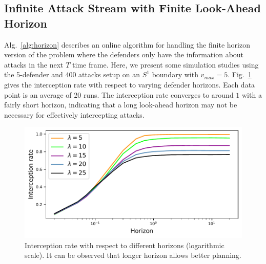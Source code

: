 \subsection{Infinite Attack Stream with Finite Look-Ahead Horizon}
Alg.~\ref{alg:horizon} describes an online \ours algorithm for handling the finite horizon version of the problem where the defenders only have the information about attacks in the next $T$ time frame.
Here, we present some simulation studies using the 5-defender and 400 attacks setup on an $S^1$ boundary with $v_{max} = 5$. Fig.~\ref{fig:horizon} gives the interception rate with respect to varying defender horizons. Each data point is an average of 20 runs. The interception rate converges to around $1$ with a fairly short horizon, indicating that a long look-ahead horizon may not be necessary for effectively intercepting attacks.
\begin{figure}
    \vspace{-1mm}
    \centering
    \includegraphics[width=0.98\linewidth]{chapters/pd/fig/horizon.pdf}
    \vspace{-2mm}
    \caption{Interception rate with respect to different horizons (logarithmic scale). It can be observed that longer horizon allows better planning.}
    \label{fig:horizon}
    \vspace{-3mm}
\end{figure}

